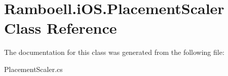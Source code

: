 \hypertarget{class_ramboell_1_1i_o_s_1_1_placement_scaler}{}\section{Ramboell.\+i\+O\+S.\+Placement\+Scaler Class Reference}
\label{class_ramboell_1_1i_o_s_1_1_placement_scaler}


The documentation for this class was generated from the following file\+:\begin{DoxyCompactItemize}
\item 
Placement\+Scaler.\+cs\end{DoxyCompactItemize}
